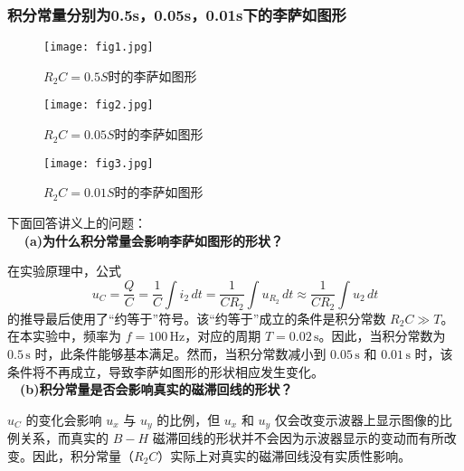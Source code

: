 \documentclass[UTF-8,twoside,cs4size]{ctexart}
\begin{document}
\subsubsection{积分常量分别为0.5s，0.05s，0.01s下的李萨如图形}
\newpage
\begin{figure}[!h]
    \centering
    \texttt{[image: fig1.jpg]}
    \caption{$R_2C=0.5S$时的李萨如图形}
\end{figure}
\begin{figure}[!h]
    \centering
    \texttt{[image: fig2.jpg]}
    \caption{$R_2C=0.05S$时的李萨如图形}
\end{figure}
\begin{figure}[!h]
    \centering
    \texttt{[image: fig3.jpg]}
    \caption{$R_2C=0.01S$时的李萨如图形}
\end{figure}
下面回答讲义上的问题：  \\
$\quad$ \textbf{(a)为什么积分常量会影响李萨如图形的形状？}\par
在实验原理中，公式
\[
u_C = \frac{Q}{C} = \frac{1}{C}\int i_2\, dt = \frac{1}{C R_2} \int u_{R_2} \, dt \approx \frac{1}{C R_2} \int u_2 \, dt
\]
的推导最后使用了“约等于”符号。该“约等于”成立的条件是积分常数 $R_2 C \gg T$。在本实验中，频率为 $f = 100\,\mathrm{Hz}$，对应的周期 $T = 0.02\,\mathrm{s}$。因此，当积分常数为 $0.5\,\mathrm{s}$ 时，此条件能够基本满足。然而，当积分常数减小到 $0.05\,\mathrm{s}$ 和 $0.01\,\mathrm{s}$ 时，该条件将不再成立，导致李萨如图形的形状相应发生变化。\\
$\quad$\textbf{(b)积分常量是否会影响真实的磁滞回线的形状？}\par
$u_C$ 的变化会影响 $u_x$ 与 $u_y$ 的比例，但 $u_x$ 和 $u_y$ 仅会改变示波器上显示图像的比例关系，而真实的 $B − H$ 磁滞回线的形状并不会因为示波器显示的变动而有所改变。因此，积分常量（$R_2 C$）实际上对真实的磁滞回线没有实质性影响。
\end{document}
